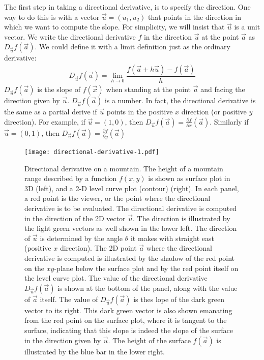 \documentclass[conference,final,11pt,technote,onecolumn]{IEEEtran}\usepackage[]{graphicx}\usepackage[]{color}
\begin{document}
The first step in taking a directional derivative, is to specify the direction. One way to do this is with a vector $\vec u=(u_1,u_2)$ that points in the direction in which we want to compute the slope. For simplicity, we will insist that $\vec u$ is a unit vector. We write the directional derivative $f$ in the direction $\vec u$ at the point $\vec a$ as $D_{\vec u}f(\vec a)$. We could define it with a limit definition just as the ordinary derivative:
\begin{eqnarray}
\nonumber D_{\vec u}f(\vec a) = \lim_{h\rightarrow 0}\dfrac{f(\vec a+h\vec u)-f(\vec a)}{h}
\end{eqnarray}
$D_{\vec u}f(\vec a)$ is the slope of $f(\vec x)$ when standing at the point $\vec a$ and facing the direction given by $\vec u$. $D_{\vec u}f(\vec a)$ is a number. In fact, the directional derivative is the same as a partial derive if $\vec u$ points in the positive $x$ direction (or positive $y$ direction). For example, if $\vec u=(1,0)$, then $D_{\vec u}f(\vec a) = \frac{\partial f}{\partial x}(\vec a)$. Similarly if $\vec u=(0,1)$, then $D_{\vec u}f(\vec a) = \frac{\partial f}{\partial y}(\vec a)$
\begin{figure}[!h]
\centering
\texttt{[image: directional-derivative-1.pdf]}
\caption{\label{fig:directional_derivative_1}Directional derivative on a mountain\cite{mathInsight:DirectionalDerivative}. The height of a mountain range described by a function $f(x,y)$ is shown as surface plot in 3D (left), and a 2-D level curve plot (contour) (right). In each panel, a red point is the viewer, or the point where the directional derivative is to be evaluated. The directional derivative is computed in the direction of the 2D vector $\vec u$. The direction is illustrated by the light green vectors as well shown in the lower left. The direction of $\vec u$ is determined by the angle $\theta$ it makes with straight east (positive $x$ direction). The 2D point $\vec a$ where the directional derivative is computed is illustrated by the shadow of the red point on the $xy$-plane below the surface plot and by the red point itself on the level curve plot. The value of the directional derivative $D_{\vec u}f(\vec a)$ is shown at the bottom of the panel, along with the value of $\vec a$ itself. The value of $D_{\vec u}f(\vec a)$ is thes lope of the dark green vector to its right. This dark green vector is also shown emanating from the red point on the surface plot, where it is tangent to the surface, indicating that this slope is indeed the slope of the surface in the direction given by $\vec u$. The height of the surface $f(\vec a)$ is illustrated by the blue bar in the lower right.}
\end{figure}
\end{document}
